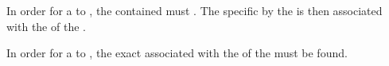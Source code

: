 \noindent In order for a  to , the  contained must . The specific   by the  is then associated with the  of the .

\noindent In order for a  to , the exact  associated with the  of the  must be found.

